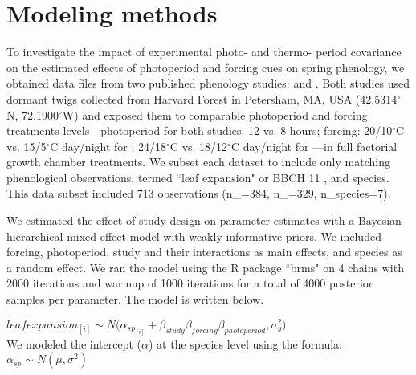 \documentclass[11pt]{article}
\begin{document}
\section*{Modeling methods}
To investigate the impact of experimental photo- and thermo- period covariance on the estimated effects of photoperiod and forcing cues on spring phenology, we obtained data files from two published phenology studies: \cite{Flynn2018} and \cite{Buonaiuto:2021ug}. Both studies used dormant twigs collected from Harvard Forest in Petersham, MA, USA (42.5314$^{\circ}$N, 72.1900$^{\circ}$W)  and exposed them to comparable photoperiod and forcing treatments levels---photoperiod for both studies: 12 vs. 8 hours; forcing: 20/10$^{\circ}$C vs. 15/5$^{\circ}$C day/night for \citet{Flynn2018}; 24/18$^{\circ}$C vs. 18/12$^{\circ}$C day/night for \citet{Buonaiuto:2021ug}---in full factorial growth chamber treatments. We subset each dataset to include only matching phenological observations, termed ``leaf expansion" or BBCH 11 \citep{Finn2007}, and species. This data subset included 713 observations (n_{\cite{Flynn2018}}=384, n_{\cite{Buonaiuto:2021ug}}=329, n_{species}=7).

We estimated the effect of study design on parameter estimates with a Bayesian hierarchical mixed effect model with weakly informative priors. %
We included forcing, photoperiod, study and their interactions as main effects, and species as a random effect. We ran the model using the R package ``brms" \citep{Burkner2018} on 4 chains with 2000 iterations and warmup of 1000 iterations for a total of 4000 posterior samples per parameter. The model is written below.

$leafexpansion_{[i]} \sim N(\alpha_{sp_{[i]}}+\beta_{study} $\times$ \beta_{forcing} $\times$ \beta_{photoperiod}, \sigma_y^2)$\\

 We modeled the intercept ($\alpha$) at the species level using the formula:\\

$\alpha_{sp} \sim N(\mu,\sigma^2)$\\

\end{document}
